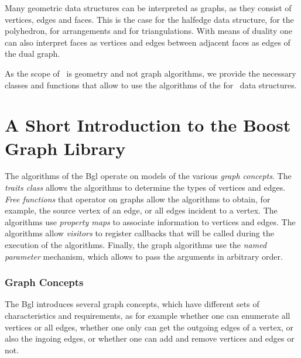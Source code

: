

Many geometric data structures can be interpreted as graphs, as they consist of
vertices, edges and faces. This is the case for the halfedge data structure,
for the polyhedron, for arrangements and for triangulations. With means of
duality one can also interpret faces as vertices and edges between adjacent
faces as edges of the dual graph. 


As the scope of \cgal\ is geometry and not graph algorithms, we
provide the necessary classes and functions that allow to use the
algorithms of the  for \cgal\ data structures.

\section{A Short Introduction to the Boost Graph Library}

The algorithms of the {\sc Bgl} operate on models of the various {\em graph concepts}. 
The {\em traits class}  allows the algorithms to determine the types of vertices and edges. 
{\em Free functions} that operator on graphs allow the algorithms to obtain,
for example, the source vertex of an edge, or  all edges incident to a vertex. The algorithms 
use {\em property maps} to associate information to vertices and edges. 
The algorithms allow {\em visitors} to register callbacks that will be called
during the execution of the algorithms. Finally, the graph algorithms use
the {\em named parameter} mechanism, which allows to pass the  arguments in
arbitrary order.


\subsubsection*{Graph Concepts}

The {\sc Bgl} introduces several graph concepts, which have different sets of characteristics and requirements,
as for example whether one can enumerate all vertices or all edges, whether one only can get the outgoing 
edges of a vertex, or also the ingoing edges, or whether one can add and remove vertices and edges or not. 

